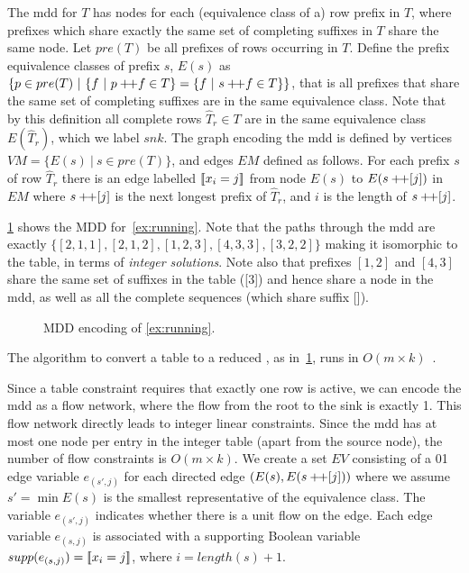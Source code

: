 \documentclass[a4paper,UKenglish,cleveref,autoref,thm-restate]{lipics-v2021}
\begin{document}
The \gls{mdd} for $T$ has nodes for each (equivalence class of a) row prefix in $T$, where prefixes which share exactly the same set of completing suffixes in $T$ share the same node.
Let $pre(T)$ be all prefixes of rows occurring in $T$.
Define the prefix equivalence classes of prefix $s$,
$E(s)$ 
as $\{ p \in pre(T) ~|~ \{ f ~|~ p +\!\!+ f \in T\} = \{ f ~|~ s +\!\!+ f \in T\}\}$, that is all prefixes that share the same set of completing suffixes are in the same equivalence class. 
Note that by this definition all complete rows $\hat{T}_r \in T$ are in the same equivalence class $E(\hat{T}_r)$, which we label $snk$.
The graph encoding the \gls{mdd} is defined by
vertices $VM = \{ E(s)~|~ s \in pre(T) \}$, 
and edges $EM$ defined as follows.
For each prefix $s$ of row $\hat{T}_r$ 
there is an edge labelled $\be{i}{j}$ from node
$E(s)$ to $E(s +\!\!+ [j])$ in $EM$ where $s +\!\!+ [j]$ is the next longest prefix of $\hat{T}_r$, and $i$ is the length of $s +\!\!+ [j]$. 


\cref{fig:mdd} shows the MDD for~\cref{ex:running}.
Note that the paths through the \gls{mdd} are exactly
$\{ [2,1,1], [2,1,2], [1,2,3], [4,3,3], [3,2,2]\}$ making it isomorphic to the table, in terms of \emph{integer solutions}.
Note also that prefixes $[1,2]$ and $[4,3]$ share the same set of suffixes in the table ([3]) and hence share a node in the \gls{mdd}, as well as all the complete sequences (which share suffix []). 





\begin{figure}[H]
\centering
\mddDiagram{15mm}{12mm}
\caption{MDD encoding of \cref{ex:running}.}
\label{fig:mdd}
\end{figure}

The algorithm to convert a table to a reduced , as in~\cref{fig:mdd}, runs in $O(m \times k)$~\cite{DBLP:journals/constraints/ChengY10}. 

Since a table constraint requires that exactly one row is active, we can encode the \gls{mdd} as a flow network, where the flow from the root to the sink is exactly 1. This flow network directly leads to integer linear constraints. Since the \gls{mdd} has at most one node per entry in the integer table (apart from the source node), the number of flow constraints is $O(m \times k)$.
We create a set $EV$ consisting of a 01 edge variable $e_{(s',j)}$ for each directed edge $(E(s),E(s +\!\!+ [j]))$ where
we assume $s' = \min E(s)$ is the smallest representative of the equivalence class.
The variable $e_{(s',j)}$ indicates whether there is a unit flow on the edge.
Each edge variable $e_{(s, j)}$ is associated with a supporting Boolean variable $supp(e_{(s,j)}) = [\![x_i = j]\!]$, where $i = length(s) + 1$. 
\end{document}
